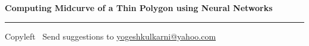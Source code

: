 
\graphicspath{{images/}}

\footnotesize


\begin{center}
\Large{\textbf{Computing Midcurve of a Thin Polygon using Neural Networks}}  
\end{center}

\begin{multicols}{2}

\end{multicols}

\rule{\linewidth}{0.25pt}
\scriptsize
Copyleft \textcopyleft\  Send suggestions to 
\href{http://www.yogeshkulkarni.com}{yogeshkulkarni@yahoo.com}


